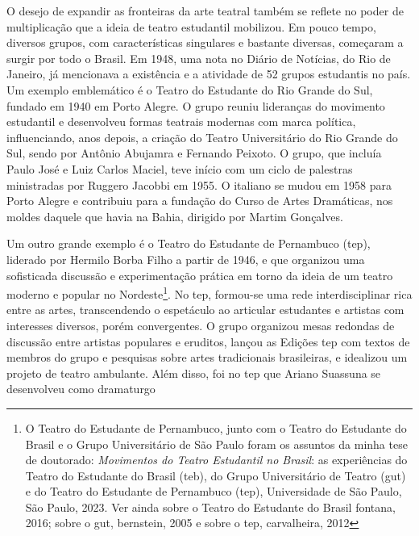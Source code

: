 \subject{Constituição de uma cena estudantil no teatro brasileiro dos anos
1940 e 1950}

O desejo de expandir as fronteiras da arte teatral também se reflete no
poder de multiplicação que a ideia de teatro estudantil mobilizou. Em
pouco tempo, diversos grupos, com características singulares e bastante
diversas, começaram a surgir por todo o Brasil. Em 1948, uma nota no
Diário de Notícias, do Rio de Janeiro, já mencionava a existência e a
atividade de 52 grupos estudantis no país. Um exemplo emblemático é o
Teatro do Estudante do Rio Grande do Sul, fundado em 1940 em Porto
Alegre. O grupo reuniu lideranças do movimento estudantil e desenvolveu
formas teatrais modernas com marca política, influenciando, anos depois,
a criação do Teatro Universitário do Rio Grande do Sul, sendo por
Antônio Abujamra e Fernando Peixoto. O grupo, que incluía Paulo José e
Luiz Carlos Maciel, teve início com um ciclo de palestras ministradas
por Ruggero Jacobbi em 1955. O italiano se mudou em 1958 para Porto
Alegre e contribuiu para a fundação do Curso de Artes Dramáticas, nos
moldes daquele que havia na Bahia, dirigido por Martim Gonçalves.

Um outro grande exemplo é o Teatro do Estudante de Pernambuco ({\sc tep}),
liderado por Hermilo Borba Filho a partir de 1946, e que organizou uma
sofisticada discussão e experimentação prática em torno da ideia de um
teatro moderno e popular no Nordeste\footnote{O Teatro do Estudante de
  Pernambuco, junto com o Teatro do Estudante do Brasil e o Grupo
  Universitário de São Paulo foram os assuntos da minha tese de
  doutorado: {\it Movimentos do Teatro Estudantil no Brasil}: as
  experiências do Teatro do Estudante do Brasil ({\sc teb}), do Grupo
  Universitário de Teatro ({\sc gut}) e do Teatro do Estudante de Pernambuco
  ({\sc tep}), Universidade de São Paulo, São Paulo, 2023. Ver ainda sobre o
  Teatro do Estudante do Brasil {\sc fontana}, 2016; sobre o {\sc gut}, {\sc bernstein},
  2005 e sobre o {\sc tep}, {\sc carvalheira}, 2012}. No {\sc tep}, formou-se uma rede
interdisciplinar rica entre as artes, transcendendo o espetáculo ao
articular estudantes e artistas com interesses diversos, porém
convergentes. O grupo organizou mesas redondas de discussão entre
artistas populares e eruditos, lançou as Edições {\sc tep} com textos de
membros do grupo e pesquisas sobre artes tradicionais brasileiras, e
idealizou um projeto de teatro ambulante. Além disso, foi no {\sc tep} que
Ariano Suassuna se desenvolveu como dramaturgo


